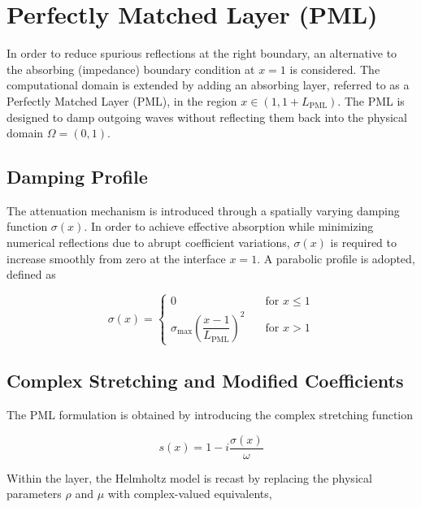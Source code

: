 
\section{Perfectly Matched Layer (PML)}
\label{sc:15}

In order to reduce spurious reflections at the right boundary, an alternative to the absorbing (impedance) boundary condition at \(x = 1\) is considered. The computational domain is extended by adding an absorbing layer, referred to as a Perfectly Matched Layer (PML), in the region \(x \in (1, 1 + L_{\mathrm{PML}})\). The PML is designed to damp outgoing waves without reflecting them back into the physical domain \(\Omega = (0,1)\).

\subsection{Damping Profile}

The attenuation mechanism is introduced through a spatially varying damping function \(\sigma(x)\). In order to achieve effective absorption while minimizing numerical reflections due to abrupt coefficient variations, \(\sigma(x)\) is required to increase smoothly from zero at the interface \(x = 1\). A parabolic profile is adopted, defined as

\begin{equation}
    \sigma(x) =
    \begin{cases}
        0 & \quad \text{for } x \leq 1 \\
        \sigma_{\max}\left(\dfrac{x - 1}{L_{\mathrm{PML}}}\right)^{2} & \quad \text{for } x > 1
    \end{cases}
    \label{eq:sigma_pml}
\end{equation}

\subsection{Complex Stretching and Modified Coefficients}

The PML formulation is obtained by introducing the complex stretching function

\begin{equation}
    s(x) = 1 - i\frac{\sigma(x)}{\omega}
    \label{eq:stretching}
\end{equation}

Within the layer, the Helmholtz model is recast by replacing the physical parameters \(\rho\) and \(\mu\) with complex-valued equivalents,

